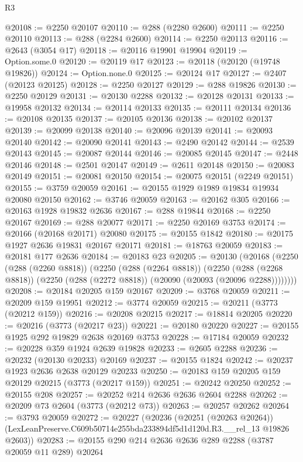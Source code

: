 \begin{lexlean}{R3}
\begin{coremodule}
@20108 := @2250 @20107
@20110 := @288 (@2280 @2600)
@20111 := @2250 @20110
@20113 := @288 (@2284 @2600)
@20114 := @2250 @20113
@20116 := @2643 (@3054 @17)
@20118 := @20116 @19901 @19904
@20119 := Option.some.{0}
@20120 := @20119 @17
@20123 := @20118 (@20120 (@19748 @19826))
@20124 := Option.none.{0}
@20125 := @20124 @17
@20127 := @2407 (@20123 @20125)
@20128 := @2250 @20127
@20129 := @288 @19826
@20130 := @2250 @20129
@20131 := @20130 @2288
@20132 := @20128 @20131
@20133 := @19958 @20132
@20134 := @20114 @20133
@20135 := @20111 @20134
@20136 := @20108 @20135
@20137 := @20105 @20136
@20138 := @20102 @20137
@20139 := @20099 @20138
@20140 := @20096 @20139
@20141 := @20093 @20140
@20142 := @20090 @20141
@20143 := @2490 @20142
@20144 := @2539 @20143
@20145 := @20087 @20144
@20146 := @20085 @20145
@20147 := @2448 @20146
@20148 := @2501 @20147
@20149 := @2611 @20148
@20150 := @20083 @20149
@20151 := @20081 @20150
@20154 := @20075 @20151 (@2249 @20151)
@20155 := @3759 @20059
@20161 := @20155 @1929 @1989 @19834 @19934 @20080 @20150
@20162 := @3746 @20059
@20163 := @20162 @305
@20166 := @20163 @1928 @19832 @2636
@20167 := @288 @19844
@20168 := @2250 @20167
@20169 := @288 @20077
@20171 := @2250 @20169 @3753
@20174 := @20166 (@20168 @20171) @20080
@20175 := @20155 @1842
@20180 := @20175 @1927 @2636 @19831 @20167 @20171
@20181 := @18763 @20059
@20183 := @20181 @177 @2636
@20184 := @20183 @23
@20205 := @20130
    (@20168
      (@2250
        (@288 (@2260 @8818))
        (@2250
          (@288 (@2264 @8818))
          (@2250
            (@288 (@2268 @8818))
            (@2250 (@288 (@2272 @8818)) (@20090 (@20093 (@20096 @2288))))))))
@20208 := @20184 @20205 @159 @20167
@20209 := @3768 @20059
@20211 := @20209 @159 @19951
@20212 := @3774 @20059
@20215 := @20211 (@3773 (@20212 @159))
@20216 := @20208 @20215
@20217 := @18814 @20205
@20220 := @20216 (@3773 (@20217 @23))
@20221 := @20180 @20220
@20227 := @20155 @1925 @292 @19829 @2638 @20169 @3753
@20228 := @17184 @20059
@20232 := @20228 @359 @1924 @2639 @19828
@20233 := @2605 @2288
@20236 := @20232 (@20130 @20233) @20169
@20237 := @20155 @1824
@20242 := @20237 @1923 @2636 @2638 @20129 @20233
@20250 := @20183 @159 @20205 @159 @20129 @20215 (@3773 (@20217 @159))
@20251 := @20242 @20250
@20252 := @20155 @208
@20257 := @20252 @214 @2636 @2636 @2604 @2288
@20262 := @20209 @73 @2604 (@3773 (@20212 @73))
@20263 := @20257 @20262
@20264 := @3793 @20059
@20272 := @20227
    (@20236
      (@20251 (@20263 @20264))
      (LexLeanPreserve.C609b50714e255bda233894df5d1d120d.R3.__rel_13 @19826 @2603))
@20283 := @20155 @290 @214 @2636 @2636 @289 @2288 (@3787 @20059 @11 @289) @20264

\end{coremodule}
\end{lexlean}
